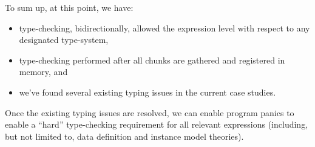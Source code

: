 To sum up, at this point, we have:

\begin{itemize}
      \item type-checking, bidirectionally, allowed the expression level with
            respect to any designated type-system,
      \item type-checking performed after all chunks are gathered and registered
            in memory, and
      \item we've found several existing typing issues in the current case
            studies.
\end{itemize}

Once the existing typing issues are resolved, we can enable program panics to
enable a ``hard'' type-checking requirement for all relevant expressions
(including, but not limited to, data definition and instance model theories).
